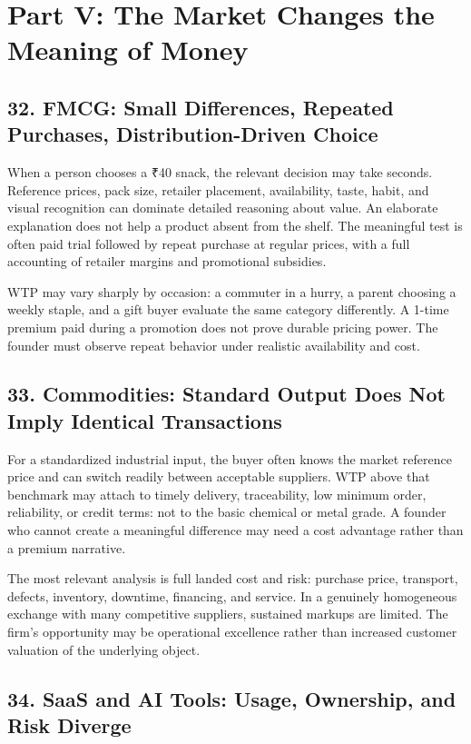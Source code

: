 \section*{Part V: The Market Changes the Meaning of Money}

\subsection*{32. FMCG: Small Differences, Repeated Purchases, Distribution-Driven Choice}

When a person chooses a ₹40 snack, the relevant decision may take seconds. Reference prices, pack size, retailer placement, availability, taste, habit, and visual recognition can dominate detailed reasoning about value. An elaborate explanation does not help a product absent from the shelf. The meaningful test is often paid trial followed by repeat purchase at regular prices, with a full accounting of retailer margins and promotional subsidies.

WTP may vary sharply by occasion: a commuter in a hurry, a parent choosing a weekly staple, and a gift buyer evaluate the same category differently. A 1-time premium paid during a promotion does not prove durable pricing power. The founder must observe repeat behavior under realistic availability and cost.

\subsection*{33. Commodities: Standard Output Does Not Imply Identical Transactions}

For a standardized industrial input, the buyer often knows the market reference price and can switch readily between acceptable suppliers. WTP above that benchmark may attach to timely delivery, traceability, low minimum order, reliability, or credit terms: not to the basic chemical or metal grade. A founder who cannot create a meaningful difference may need a cost advantage rather than a premium narrative.

The most relevant analysis is full landed cost and risk: purchase price, transport, defects, inventory, downtime, financing, and service. In a genuinely homogeneous exchange with many competitive suppliers, sustained markups are limited. The firm's opportunity may be operational excellence rather than increased customer valuation of the underlying object.

\subsection*{34. SaaS and AI Tools: Usage, Ownership, and Risk Diverge}

